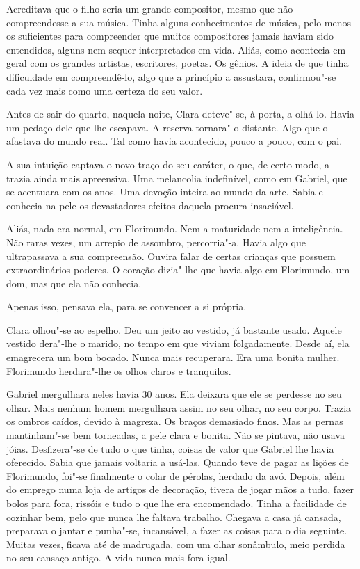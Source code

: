 Acreditava que o filho seria um grande compositor, mesmo que não
compreendesse a sua música. Tinha alguns conhecimentos de música, pelo
menos os suficientes para compreender que muitos compositores jamais
haviam sido entendidos, alguns nem sequer interpretados em vida. Aliás,
como acontecia em geral com os grandes artistas, escritores, poetas. Os
gênios. A ideia de que tinha dificuldade em compreendê-lo, algo que a
princípio a assustara, confirmou"-se cada vez mais como uma certeza do
seu valor.

Antes de sair do quarto, naquela noite, Clara deteve"-se, à porta, a
olhá-lo. Havia um pedaço dele que lhe escapava. A reserva tornara"-o
distante. Algo que o afastava do mundo real. Tal como havia acontecido,
pouco a pouco, com o pai.

A sua intuição captava o novo traço do seu caráter, o que, de certo
modo, a trazia ainda mais apreensiva. Uma melancolia indefinível, como
em Gabriel, que se acentuara com os anos. Uma devoção inteira ao mundo
da arte. Sabia e conhecia na pele os devastadores efeitos daquela
procura insaciável.

Aliás, nada era normal, em Florimundo. Nem a maturidade nem a
inteligência. Não raras vezes, um arrepio de assombro, percorria"-a.
Havia algo que ultrapassava a sua compreensão. Ouvira falar de certas
crianças que possuem extraordinários poderes. O coração dizia"-lhe que
havia algo em Florimundo, um dom, mas que ela não conhecia.

Apenas isso, pensava ela, para se convencer a si própria.

Clara olhou"-se ao espelho. Deu um jeito ao vestido, já bastante usado.
Aquele vestido dera"-lhe o marido, no tempo em que viviam folgadamente.
Desde aí, ela emagrecera um bom bocado. Nunca mais recuperara. Era uma
bonita mulher. Florimundo herdara"-lhe os olhos claros e tranquilos.

Gabriel mergulhara neles havia 30 anos. Ela deixara que ele se perdesse
no seu olhar. Mais nenhum homem mergulhara assim no seu olhar, no seu
corpo. Trazia os ombros caídos, devido à magreza. Os braços demasiado
finos. Mas as pernas mantinham"-se bem torneadas, a pele clara e bonita.
Não se pintava, não usava jóias. Desfizera"-se de tudo o que tinha,
coisas de valor que Gabriel lhe havia oferecido. Sabia que jamais
voltaria a usá-las. Quando teve de pagar as lições de Florimundo, foi"-se
finalmente o colar de pérolas, herdado da avó. Depois, além do emprego
numa loja de artigos de decoração, tivera de jogar mãos a tudo, fazer
bolos para fora, rissóis e tudo o que lhe era encomendado. Tinha a
facilidade de cozinhar bem, pelo que nunca lhe faltava trabalho. Chegava
a casa já cansada, preparava o jantar e punha"-se, incansável, a fazer as
coisas para o dia seguinte. Muitas vezes, ficava até de madrugada, com
um olhar sonâmbulo, meio perdida no seu cansaço antigo. A vida nunca
mais fora igual.

